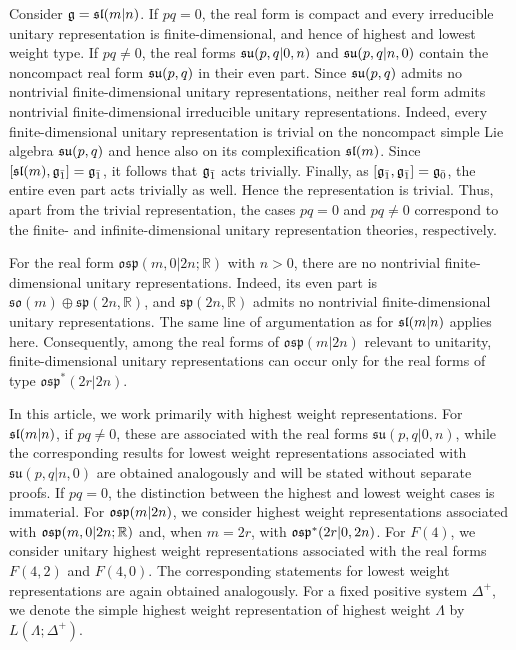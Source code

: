 \begin{remark} \label{rmk::infinite_sl}
Consider $\gg=\sl(m\vert n)$. If $pq=0$, the real form is compact and every irreducible unitary representation is finite-dimensional, and hence of highest and lowest weight type. If $pq\neq0$, the real forms $\su(p,q\vert0,n)$ and $\su(p,q\vert n,0)$ contain the noncompact real form $\su(p,q)$ in their even part. Since $\su(p,q)$ admits no nontrivial finite-dimensional unitary representations, neither real form admits nontrivial finite-dimensional irreducible unitary representations. Indeed, every finite-dimensional unitary representation is trivial on the noncompact simple Lie algebra $\su(p,q)$ and hence also on its complexification $\sl(m)$. Since $[\sl(m),\odd]=\odd$, it follows that $\odd$ acts trivially. Finally, as $[\odd,\odd]=\even$, the entire even part acts trivially as well. Hence the representation is trivial. Thus, apart from the trivial representation, the cases $pq=0$ and $pq\neq0$ correspond to the finite- and infinite-dimensional unitary representation theories, respectively.
\end{remark}


\begin{remark}
For the real form $\mathfrak{osp}(m,0\vert 2n;\mathbb R)$ with $n>0$, there are no nontrivial finite-dimensional unitary representations. Indeed, its even part is $\mathfrak{so}(m)\oplus\mathfrak{sp}(2n,\mathbb R)$, and $\mathfrak{sp}(2n,\mathbb R)$ admits no nontrivial finite-dimensional unitary representations. The same line of argumentation as for $\sl(m\vert n)$ applies here. Consequently, among the real forms of $\mathfrak{osp}(m\vert 2n)$ relevant to unitarity, finite-dimensional unitary representations can occur only for the real forms of type $\mathfrak{osp}^{\ast}(2r\vert 2n)$.
\end{remark}


In this article, we work primarily with highest weight representations. For $\sl(m\vert n)$, if $pq\neq0$, these are associated with the real forms $\mathfrak{su}(p,q\vert0,n)$, while the corresponding results for lowest weight representations associated with $\mathfrak{su}(p,q\vert n,0)$ are obtained analogously and will be stated without separate proofs. If $pq=0$, the distinction between the highest and lowest weight cases is immaterial. For $\osp(m\vert2n)$, we consider highest weight representations associated with $\osp(m,0\vert2n;\RR)$ and, when $m=2r$, with $\osp^{\ast}(2r\vert0,2n)$. For $F(4)$, we consider unitary highest weight representations associated with the real forms $F(4,2)$ and $F(4,0)$. The corresponding statements for lowest weight representations are again obtained analogously. For a fixed positive system $\Delta^+$, we denote the simple highest weight representation of highest weight $\Lambda$ by $L(\Lambda;\Delta^+)$.

